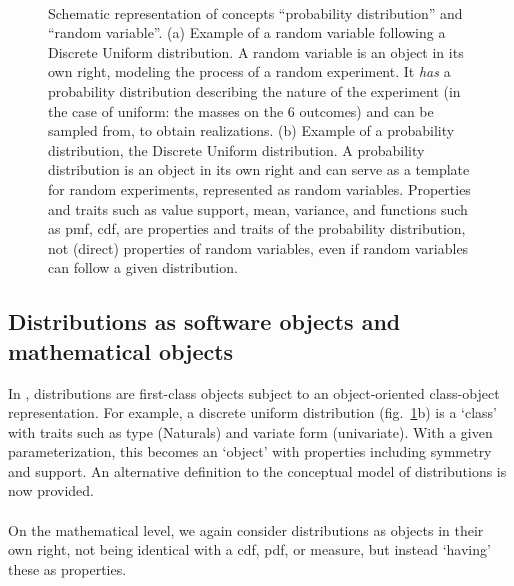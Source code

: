 \begin{figure}[ht!]
\centering
{}
\\
\caption[Discrete Uniform Random Variable and Distribution]{Schematic representation of concepts ``probability distribution'' and ``random variable''. (a) Example of a random variable following a Discrete Uniform distribution. A random variable is an object in its own right, modeling the process of a random experiment. It \emph{has} a probability distribution describing the nature of the experiment (in the case of uniform: the masses on the 6 outcomes) and can be sampled from, to obtain realizations. (b) Example of a probability distribution, the Discrete Uniform distribution. A probability distribution is an object in its own right and can serve as a template for random experiments, represented as random variables. Properties and traits such as value support, mean, variance, and functions such as pmf, cdf, are properties and traits of the probability distribution, not (direct) properties of random variables, even if random variables can follow a given distribution.}
\label{fig:distr6_discreteuniform}
\end{figure}


\subsection{Distributions as software objects and mathematical objects}

In , distributions are first-class objects subject to an object-oriented class-object representation. For example, a discrete uniform distribution (fig.~\ref{fig:distr6_discreteuniform}b) is a `class' with traits such as type (Naturals) and variate form (univariate). With a given parameterization, this becomes an `object' with properties including symmetry and support. An alternative definition to the conceptual model of distributions is now provided.
\\\\
On the mathematical level, we again consider distributions as objects in their own right, not being identical with a cdf, pdf, or measure, but instead `having' these as properties.

